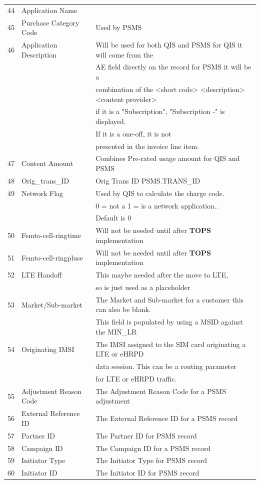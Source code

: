 \documentclass[12pt,twoside]{article}
\begin{document}
\begin{longtable}{c|l|l}
44 & Application Name & \\
45 & Purchase Category Code & Used by PSMS\\
46 & Application Description & Will be used for both QIS and PSMS for QIS it will come from the\\
&  & AE field directly on the record for PSMS it will be a\\
&  & combination of the <short code> <description> <content provider>\\
&  & if it is a "Subscription", "Subscription -" is displayed.\\
&  & If it is a one-off, it is not\\
&  & presented in the invoice line item.\\
47 & Content Amount & Combines Pre-rated usage amount for QIS and PSMS\\
48 & Orig\_trans\_ID & Orig Trans ID PSMS.TRANS\_ID\\
49 & Network Flag & Used by QIS to calculate the charge code.\\
&  & 0 = not a 1 = is a network application..\\
&  & Default is 0\\
50 & Femto-cell-ringtime & Will not be needed until after \textbf{TOPS} implementation\\
51 & Femto-cell-ringpluse & Will not be needed until after \textbf{TOPS} implementation\\
52 & LTE Handoff & This maybe needed after the move to LTE,\\
&  & so is just used as a placeholder\\
53 & Market/Sub-market & The Market and Sub-market for a customer this can also be blank.\\
&  & This field is populated by using a MSID against the MIN\_LR\\
54 & Originating IMSI & The IMSI assigned to the SIM card originating a LTE or eHRPD\\
&  & data session. This can be a routing parameter\\
&  & for LTE or eHRPD traffic.\\
55 & Adjustment Reason Code & The Adjustment Reason Code for a PSMS adjustment\\
56 & External Reference ID & The External Reference ID for a PSMS record\\
57 & Partner ID & The Partner ID for PSMS record\\
58 & Campaign ID & The Campaign ID for a PSMS record\\
59 & Initiator Type & The Initiator Type for PSMS record\\
60 & Initiator ID & The Initiator ID for PSMS record\\
\hline
\end{longtable}
\normalsize
\end{document}
